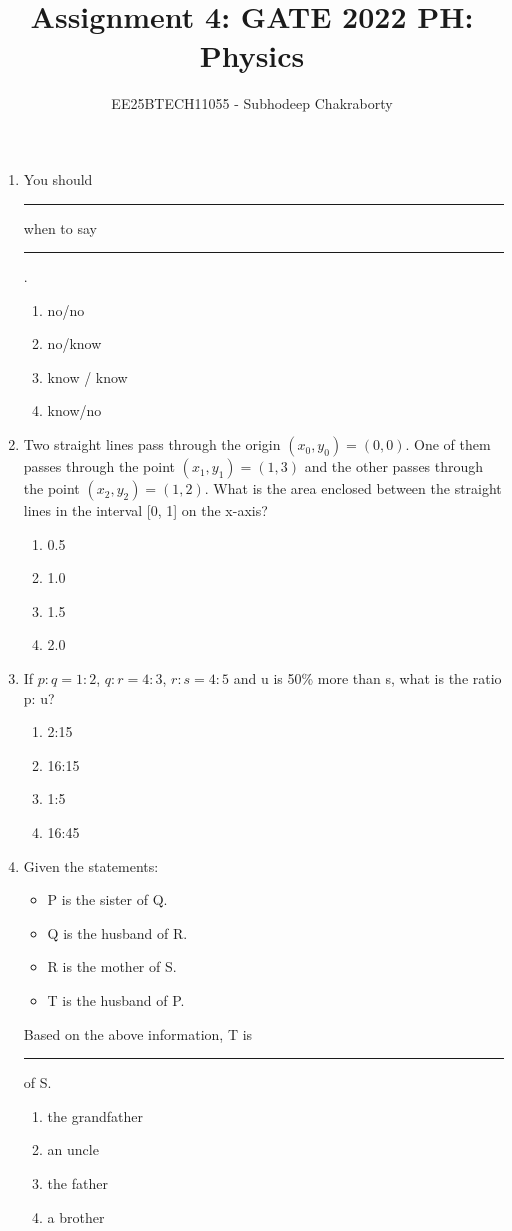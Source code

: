 \documentclass[journal,12pt,onecolumn]{IEEEtran}
\theoremstyle{remark}
\begin{document}

\vspace{3cm}

\title{Assignment 4: GATE 2022 PH: Physics}
\author{EE25BTECH11055 - Subhodeep Chakraborty}
\maketitle
\hrulefill
\bigskip

\renewcommand{\thefigure}{\theenumi}
\renewcommand{\thetable}{\theenumi}


\begin{enumerate}

\item
You should \rule{1cm}{0.4pt} when to say \rule{1cm}{0.4pt}.
\begin{enumerate}
    \item no/no
    \item no/know
    \item know / know
    \item know/no
\end{enumerate}


\item
Two straight lines pass through the origin $(x_{0},y_{0})=(0,0)$. One of them passes through the point $(x_{1},y_{1})=(1,3)$ and the other passes through the point $(x_{2},y_{2})=(1,2)$. What is the area enclosed between the straight lines in the interval [0, 1] on the x-axis?
\begin{enumerate}
    \item 0.5
    \item 1.0
    \item 1.5
    \item 2.0
\end{enumerate}


\item
If $p:q=1:2$, $q:r=4:3$, $r:s=4:5$ and u is 50\% more than s, what is the ratio p: u?
\begin{enumerate}
    \item 2:15
    \item 16:15
    \item 1:5
    \item 16:45
\end{enumerate}


\item
Given the statements:
\begin{itemize}
    \item P is the sister of Q.
    \item Q is the husband of R.
    \item R is the mother of S.
    \item T is the husband of P.
\end{itemize}
Based on the above information, T is \rule{1cm}{0.4pt} of S.
\begin{enumerate}
    \item the grandfather
    \item an uncle
    \item the father
    \item a brother
\end{enumerate}



\end{enumerate}
\end{document}
